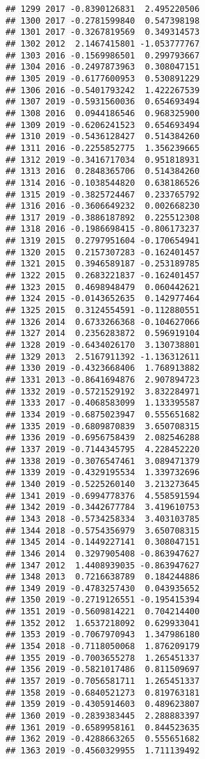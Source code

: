 \documentclass[
]{article}
\begin{document}
\begin{verbatim}
## 1299 2017 -0.8390126831  2.495220506
## 1300 2017 -0.2781599840  0.547398198
## 1301 2017 -0.3267819569  0.349314573
## 1302 2012  2.1467415801 -1.053777767
## 1303 2016 -0.1569986501  0.299793667
## 1304 2016 -0.2497873963  0.308047151
## 1305 2019 -0.6177600953  0.530891229
## 1306 2016 -0.5401793242  1.422267539
## 1307 2019 -0.5931560036  0.654693494
## 1308 2016  0.0944186546  0.968325900
## 1309 2019 -0.6206241523  0.654693494
## 1310 2019 -0.5436128427  0.514384260
## 1311 2016 -0.2255852775  1.356239665
## 1312 2019 -0.3416717034  0.951818931
## 1313 2016  0.2848365706  0.514384260
## 1314 2016 -0.1038544820  0.638186526
## 1315 2019 -0.3825724467  0.233765792
## 1316 2016 -0.3606649232  0.002668230
## 1317 2019 -0.3886187892  0.225512308
## 1318 2016 -0.1986698415 -0.806173237
## 1319 2015  0.2797951604 -0.170654941
## 1320 2015  0.2157307283 -0.162401457
## 1321 2015  0.3946589187 -0.253189785
## 1322 2015  0.2683221837 -0.162401457
## 1323 2015  0.4698948479  0.060442621
## 1324 2015 -0.0143652635  0.142977464
## 1325 2015  0.3124554591 -0.112880551
## 1326 2014  0.6733266368 -0.104627066
## 1327 2014  0.2356283872  0.596919104
## 1328 2019 -0.6434026170  3.130738801
## 1329 2013  2.5167911392 -1.136312611
## 1330 2019 -0.4323668406  1.768913882
## 1331 2013 -0.8641694876  2.907894723
## 1332 2019 -0.5721529192  3.832284971
## 1333 2017 -0.4068583099  1.133395587
## 1334 2019 -0.6875023947  0.555651682
## 1335 2019 -0.6809870839  3.650708315
## 1336 2019 -0.6956758439  2.082546288
## 1337 2019 -0.7144345795  4.228452220
## 1338 2019 -0.3076547461  3.089471379
## 1339 2019 -0.4329195534  1.339732696
## 1340 2019 -0.5225260140  3.213273645
## 1341 2019 -0.6994778376  4.558591594
## 1342 2019 -0.3442677784  3.419610753
## 1343 2018 -0.5734258334  3.403103785
## 1344 2018 -0.5754356979  3.650708315
## 1345 2014 -0.1449227141  0.308047151
## 1346 2014  0.3297905408 -0.863947627
## 1347 2012  1.4408939035 -0.863947627
## 1348 2013  0.7216638789  0.184244886
## 1349 2019 -0.4783257430  0.043935652
## 1350 2019 -0.2719126551 -0.195415394
## 1351 2019 -0.5609814221  0.704214400
## 1352 2012  1.6537218092  0.629933041
## 1353 2019 -0.7067970943  1.347986180
## 1354 2018 -0.7118050068  1.876209179
## 1355 2019 -0.7003655278  1.265451337
## 1356 2019 -0.5821017486  0.811509697
## 1357 2019 -0.7056581711  1.265451337
## 1358 2019 -0.6840521273  0.819763181
## 1359 2019 -0.4305914603  0.489623807
## 1360 2019 -0.2839383445  2.288883397
## 1361 2019 -0.6589958161  0.844523635
## 1362 2019 -0.4288663265  0.555651682
## 1363 2019 -0.4560329955  1.711139492

\end{verbatim}
\end{document}
